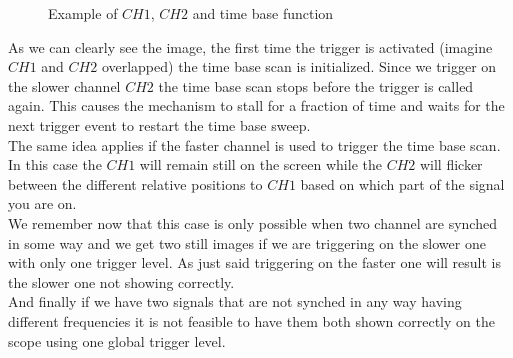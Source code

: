 \documentclass[../main.tex]{subfiles}
\begin{document}
\begin{figure}[h!]
\begin{center}

\end{center}
\caption{Example of $CH1$, $CH2$ and time base function}
\label{timebaseex}
\end{figure}

As we can clearly see the image, the first time the trigger is activated (imagine $CH1$ and $CH2$ overlapped) the time base scan is initialized. Since we trigger on the slower channel $CH2$ the time base scan stops before the trigger is called again. This causes the mechanism to stall for a fraction of time and waits for the next trigger event to restart the time base sweep.\\

The same idea applies if the faster channel is used to trigger the time base scan. In this case the $CH1$ will remain still on the screen while the $CH2$ will flicker between the different relative positions to $CH1$ based on which part of the signal you are on.\\

We remember now that this case is only possible when two channel are synched in some way and we get two still images if we are triggering on the slower one with only one trigger level. As just said triggering on the faster one will result is the slower one not showing correctly.\\

And finally if we have two signals that are not synched in any way having different frequencies it is not feasible to have them both shown correctly on the scope using one global trigger level.
\end{document}
